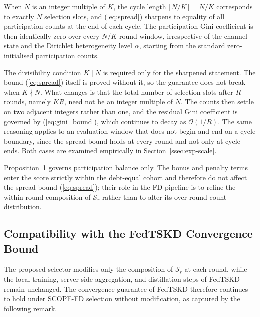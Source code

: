 \documentclass[journal]{IEEEtran}
\newcommand{\rev}[1]{#1}
\begin{document}
When $N$ is an integer multiple of $K$, the cycle length $\lceil N/K \rceil = N/K$ corresponds to exactly $N$ selection slots, and (\ref{eq:spread}) sharpens to equality of all participation counts at the end of each cycle. The participation Gini coefficient is then identically zero over every $N/K$-round window, irrespective of the channel state and the Dirichlet heterogeneity level $\alpha$, starting from the standard zero-initialised participation counts.

\rev{The divisibility condition $K \mid N$ is required only for the sharpened statement. The bound (\ref{eq:spread}) itself is proved without it, so the guarantee does not break when $K \nmid N$. What changes is that the total number of selection slots after $R$ rounds, namely $KR$, need not be an integer multiple of $N$. The counts then settle on two adjacent integers rather than one, and the residual Gini coefficient is governed by (\ref{eq:gini_bound}), which continues to decay as $\mathcal{O}(1/R)$. The same reasoning applies to an evaluation window that does not begin and end on a cycle boundary, since the spread bound holds at every round and not only at cycle ends. Both cases are examined empirically in Section~\ref{ssec:exp-scale}.}

Proposition~1 governs participation balance only. The bonus and penalty terms enter the score strictly within the debt-equal cohort and therefore do not affect the spread bound (\ref{eq:spread}); their role in the FD pipeline is to refine the within-round composition of $\mathcal{S}_r$ rather than to alter its over-round count distribution. %

\subsection{Compatibility with the FedTSKD Convergence Bound}
\label{ssec:convergence-compat}

The proposed selector modifies only the composition of $\mathcal{S}_r$ at each round, while the local training, server-side aggregation, and distillation steps of FedTSKD \cite{mu2024fedtskd} remain unchanged. The convergence guarantee of FedTSKD therefore continues to hold under SCOPE-FD selection without modification, as captured by the following remark.
\end{document}
